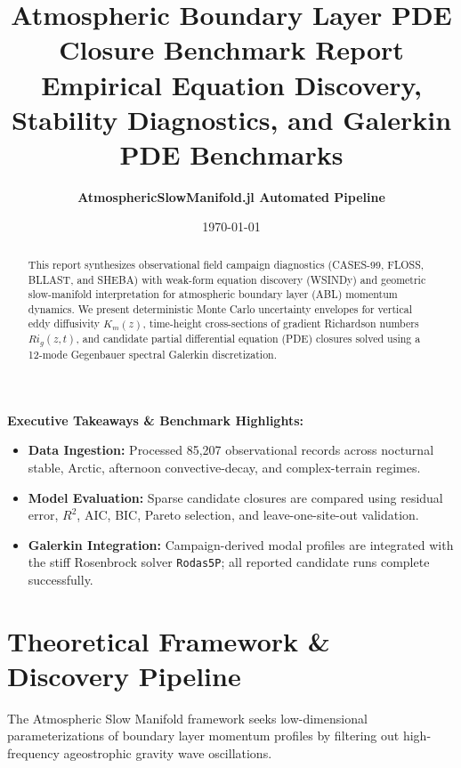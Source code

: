 \documentclass[11pt,a4paper]{article}
\title{\textbf{\Large Atmospheric Boundary Layer PDE Closure Benchmark Report}\\
\large Empirical Equation Discovery, Stability Diagnostics, and Galerkin PDE Benchmarks}
\author{\textbf{AtmosphericSlowManifold.jl Automated Pipeline}}
\date{\today}
\begin{document}
\maketitle

\begin{abstract}
\noindent This report synthesizes observational field campaign diagnostics (CASES-99, FLOSS, BLLAST, and SHEBA) with weak-form equation discovery (WSINDy) and geometric slow-manifold interpretation for atmospheric boundary layer (ABL) momentum dynamics. We present deterministic Monte Carlo uncertainty envelopes for vertical eddy diffusivity $K_m(z)$, time-height cross-sections of gradient Richardson numbers $Ri_g(z,t)$, and candidate partial differential equation (PDE) closures solved using a 12-mode Gegenbauer spectral Galerkin discretization.
\end{abstract}

\begin{tcolorbox}[executivebox]
\textbf{Executive Takeaways \& Benchmark Highlights:}
\begin{itemize}\setlength{\itemsep}{2pt}
    \item \textbf{Data Ingestion:} Processed 85,207 observational records across nocturnal stable, Arctic, afternoon convective-decay, and complex-terrain regimes.
    \item \textbf{Model Evaluation:} Sparse candidate closures are compared using residual error, $R^2$, AIC, BIC, Pareto selection, and leave-one-site-out validation.
    \item \textbf{Galerkin Integration:} Campaign-derived modal profiles are integrated with the stiff Rosenbrock solver \texttt{Rodas5P}; all reported candidate runs complete successfully.
\end{itemize}
\end{tcolorbox}

\tableofcontents
\clearpage

\section{Theoretical Framework \& Discovery Pipeline}

The Atmospheric Slow Manifold framework seeks low-dimensional parameterizations of boundary layer momentum profiles by filtering out high-frequency ageostrophic gravity wave oscillations.
\end{document}
